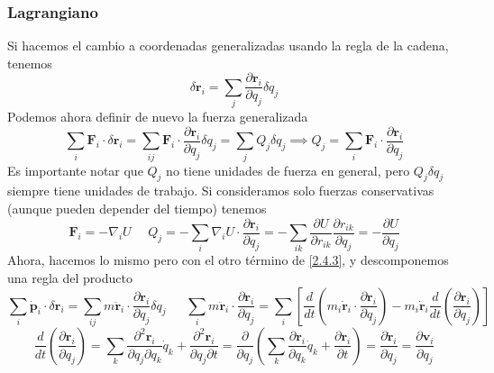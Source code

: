 \subsubsection{Lagrangiano}
Si hacemos el cambio a coordenadas generalizadas usando la regla de la cadena, tenemos
\begin{equation} \label{2.4.4}
    \delta \mathbf{r}_i = \sum_j \frac{\partial \mathbf{r}_i}{\partial q_j} \delta q_j
\end{equation} 
Podemos ahora definir de nuevo la fuerza generalizada
\begin{equation} \label{2.4.5}
    \sum_i \mathbf{F}_i \cdot \delta \mathbf{r}_i = \sum_{ij} \mathbf{F}_i \cdot \frac{\partial \mathbf{r}_i}{\partial q_j} \delta q_j = \sum_j Q_j \delta q_j \implies Q_j = \sum_i \mathbf{F}_i \cdot \frac{\partial \mathbf{r}_i}{\partial q_j}
\end{equation} 
Es importante notar que $Q_j$ no tiene unidades de fuerza en general, pero $Q_j \delta q_j$ siempre tiene unidades de trabajo. Si consideramos solo fuerzas conservativas (aunque pueden depender del tiempo) tenemos
\begin{equation} \label{2.4.6}
    \mathbf{F}_i = -\nabla_i U \ \ \ \ \ \ Q_j = -\sum_i \nabla_i U \cdot \frac{\partial \mathbf{r}_i}{\partial q_j} = - \sum_{ik} \frac{\partial U}{\partial r_{ik}} \frac{\partial r_{ik}}{\partial q_j} = - \frac{\partial U}{\partial q_j}
\end{equation} 
Ahora, hacemos lo mismo pero con el otro término de \eqref{2.4.3}, y descomponemos una regla del producto
\begin{equation} \label{2.4.7}
    \sum_i \dot{\mathbf{p}}_i \cdot \delta \mathbf{r}_i = \sum_{ij} m \ddot{\mathbf{r}}_i \cdot \frac{\partial \mathbf{r}_i}{\partial q_j} \delta q_j \ \ \ \ \ \ \ \sum_{i} m \ddot{\mathbf{r}}_i \cdot \frac{\partial \mathbf{r}_i}{\partial q_j} = \sum_i \left[ \frac{d}{dt}\left(m_i \dot{\mathbf{r}}_i \cdot \frac{\partial \mathbf{r}_i}{\partial q_j}\right)- m_i \dot{\mathbf{r}}_i\frac{d}{dt}\left(\frac{\partial \mathbf{r}_i}{\partial q_j}\right)\right]
\end{equation} 
\begin{equation} \label{2.4.8}
    \frac{d}{dt}\left(\frac{\partial \mathbf{r}_i}{\partial q_j}\right) = \sum_k \frac{\partial^2 \mathbf{r}_i}{\partial q_j \partial q_k}\dot{q}_k + \frac{\partial^2 \mathbf{r}_i}{\partial q_j \partial t} = \frac{\partial}{\partial q_j}\left( \sum_k \frac{\partial \mathbf{r}_i}{ \partial q_k}\dot{q}_k + \frac{\partial\mathbf{r}_i}{\partial t} \right)= \frac{\partial \dot{\mathbf{r}}_i}{\partial q_j} = \frac{\partial \mathbf{v}_i}{\partial q_j}
\end{equation} 
